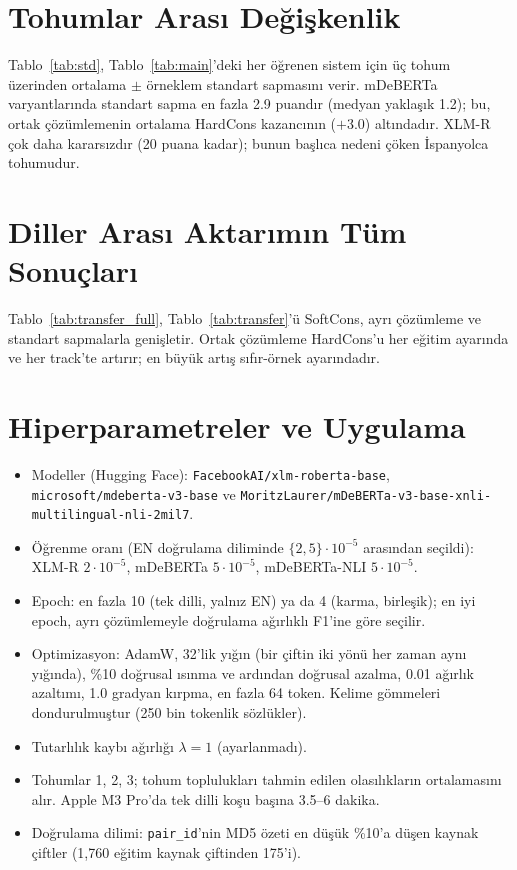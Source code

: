 \section{Tohumlar Arası Değişkenlik}
\label{app:std}

Tablo~\ref{tab:std}, Tablo~\ref{tab:main}'deki her öğrenen sistem için üç tohum üzerinden ortalama $\pm$ örneklem standart sapmasını verir. mDeBERTa varyantlarında standart sapma en fazla 2.9 puandır (medyan yaklaşık 1.2); bu, ortak çözümlemenin ortalama HardCons kazancının ($+3.0$) altındadır. XLM-R çok daha kararsızdır (20 puana kadar); bunun başlıca nedeni çöken İspanyolca tohumudur.



\section{Diller Arası Aktarımın Tüm Sonuçları}
\label{app:transfer}

Tablo~\ref{tab:transfer_full}, Tablo~\ref{tab:transfer}'ü SoftCons, ayrı çözümleme ve standart sapmalarla genişletir. Ortak çözümleme HardCons'u her eğitim ayarında ve her track'te artırır; en büyük artış sıfır-örnek ayarındadır.



\section{Hiperparametreler ve Uygulama}
\label{app:hparams}

\begin{itemize}\itemsep0pt
\item Modeller (Hugging Face): \texttt{FacebookAI/xlm-roberta-base}, \texttt{microsoft/mdeberta-v3-base} ve \texttt{MoritzLaurer/mDeBERTa-v3-base-xnli-}\allowbreak\texttt{multilingual-nli-2mil7}.
\item Öğrenme oranı (EN doğrulama diliminde $\{2,5\}\cdot10^{-5}$ arasından seçildi): XLM-R $2\cdot10^{-5}$, mDeBERTa $5\cdot10^{-5}$, mDeBERTa-NLI $5\cdot10^{-5}$.
\item Epoch: en fazla 10 (tek dilli, yalnız EN) ya da 4 (karma, birleşik); en iyi epoch, ayrı çözümlemeyle doğrulama ağırlıklı F1'ine göre seçilir.
\item Optimizasyon: AdamW, 32'lik yığın (bir çiftin iki yönü her zaman aynı yığında), \%10 doğrusal ısınma ve ardından doğrusal azalma, 0.01 ağırlık azaltımı, 1.0 gradyan kırpma, en fazla 64 token. Kelime gömmeleri dondurulmuştur (250 bin tokenlik sözlükler).
\item Tutarlılık kaybı ağırlığı $\lambda=1$ (ayarlanmadı).
\item Tohumlar 1, 2, 3; tohum toplulukları tahmin edilen olasılıkların ortalamasını alır. Apple M3 Pro'da tek dilli koşu başına 3.5--6 dakika.
\item Doğrulama dilimi: \texttt{pair\_id}'nin MD5 özeti en düşük \%10'a düşen kaynak çiftler (1{,}760 eğitim kaynak çiftinden 175'i).
\end{itemize}
